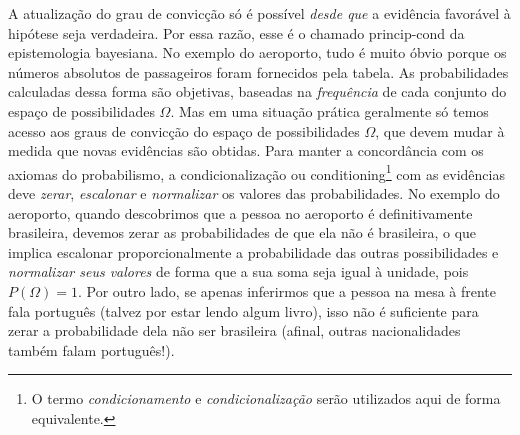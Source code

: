 \documentclass[./main.tex]{subfiles}
\begin{document}
\par A atualização do grau de convicção só é possível \textit{desde que} a evidência favorável à hipótese seja verdadeira. Por essa razão, esse é o chamado \gls{princip-cond} da epistemologia bayesiana. No exemplo do aeroporto, tudo é muito óbvio porque os números absolutos de passageiros foram fornecidos pela tabela. As probabilidades calculadas dessa forma são objetivas, baseadas na \textit{frequência} de cada conjunto do espaço de possibilidades $\Omega$. Mas em uma situação prática geralmente só temos acesso aos graus de convicção do espaço de possibilidades $\Omega$, que devem mudar à medida que novas evidências são obtidas. Para manter a concordância com os axiomas do probabilismo, a condicionalização ou \gls{conditioning}\footnote{O termo \textit{condicionamento} e \textit{condicionalização} serão utilizados aqui de forma equivalente.} com as evidências deve \textit{zerar}, \textit{escalonar} e \textit{normalizar} os valores das probabilidades. No exemplo do aeroporto, quando descobrimos que a pessoa no aeroporto é definitivamente brasileira, devemos zerar as probabilidades de que ela não é brasileira, o que implica escalonar proporcionalmente a probabilidade das outras possibilidades e \textit{normalizar seus valores} de forma que a sua soma seja igual à unidade, pois $P(\Omega) = 1$. Por outro lado, se apenas inferirmos que a pessoa na mesa à frente fala português (talvez por estar lendo algum livro), isso não é suficiente para zerar a probabilidade dela não ser brasileira (afinal, outras nacionalidades também falam português!).
\end{document}
